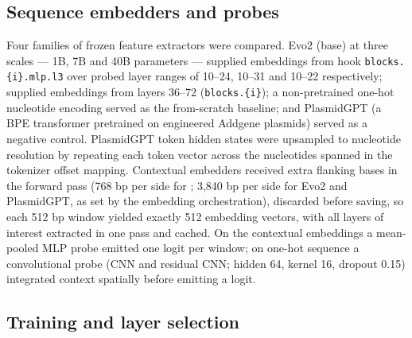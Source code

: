 \subsection*{Sequence embedders and probes}

Four families of frozen feature extractors were compared. Evo2 (base) at
three scales --- 1B, 7B and 40B parameters --- supplied embeddings from hook
\texttt{blocks.\{i\}.mlp.l3} over probed layer ranges of 10--24, 10--31 and
10--22 respectively; \model supplied embeddings from layers 36--72
(\texttt{blocks.\{i\}}); a non-pretrained one-hot nucleotide encoding served
as the from-scratch baseline; and PlasmidGPT (a BPE transformer pretrained on
engineered Addgene \cite{kamens2015addgene} plasmids) served as a negative control. PlasmidGPT token hidden states were
upsampled to nucleotide resolution by repeating each token vector across the
nucleotides spanned in the tokenizer offset mapping. Contextual embedders
received extra flanking bases in the forward pass (768 bp per side for
\model; 3,840 bp per side for Evo2 and PlasmidGPT, as set by the embedding
orchestration), discarded before saving, so each 512 bp window yielded
exactly 512 embedding vectors, with all layers of interest extracted in one
pass and cached. On the contextual embeddings a mean-pooled MLP probe emitted
one logit per window; on one-hot sequence a convolutional probe (CNN and
residual CNN; hidden 64, kernel 16, dropout 0.15) integrated context
spatially before emitting a logit.

\subsection*{Training and layer selection}


